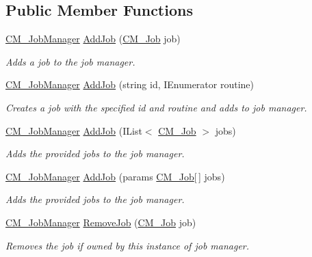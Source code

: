 \subsection*{Public Member Functions}
\begin{DoxyCompactItemize}
\item 
\hyperlink{class_c_m___job_manager}{C\+M\+\_\+\+Job\+Manager} \hyperlink{class_c_m___job_manager_a3e8f2abdcaffd8f61f8a27be1b288c66}{Add\+Job} (\hyperlink{class_c_m___job}{C\+M\+\_\+\+Job} job)
\begin{DoxyCompactList}\small\item\em Adds a job to the job manager. \end{DoxyCompactList}\item 
\hyperlink{class_c_m___job_manager}{C\+M\+\_\+\+Job\+Manager} \hyperlink{class_c_m___job_manager_a03642325160354e27b9603b8e9b71996}{Add\+Job} (string id, I\+Enumerator routine)
\begin{DoxyCompactList}\small\item\em Creates a job with the specified id and routine and adds to job manager. \end{DoxyCompactList}\item 
\hyperlink{class_c_m___job_manager}{C\+M\+\_\+\+Job\+Manager} \hyperlink{class_c_m___job_manager_a3c8aef4596141686e60e5a3166c7264a}{Add\+Job} (I\+List$<$ \hyperlink{class_c_m___job}{C\+M\+\_\+\+Job} $>$ jobs)
\begin{DoxyCompactList}\small\item\em Adds the provided jobs to the job manager. \end{DoxyCompactList}\item 
\hyperlink{class_c_m___job_manager}{C\+M\+\_\+\+Job\+Manager} \hyperlink{class_c_m___job_manager_a295f3f6cd5f10cc3646f6f85203097f6}{Add\+Job} (params \hyperlink{class_c_m___job}{C\+M\+\_\+\+Job}\mbox{[}$\,$\mbox{]} jobs)
\begin{DoxyCompactList}\small\item\em Adds the provided jobs to the job manager. \end{DoxyCompactList}\item 
\hyperlink{class_c_m___job_manager}{C\+M\+\_\+\+Job\+Manager} \hyperlink{class_c_m___job_manager_a70e6b6c8c3252c52549123df98349db4}{Remove\+Job} (\hyperlink{class_c_m___job}{C\+M\+\_\+\+Job} job)
\begin{DoxyCompactList}\small\item\em Removes the job if owned by this instance of job manager. \end{DoxyCompactList}\item 

\end{DoxyCompactItemize}
